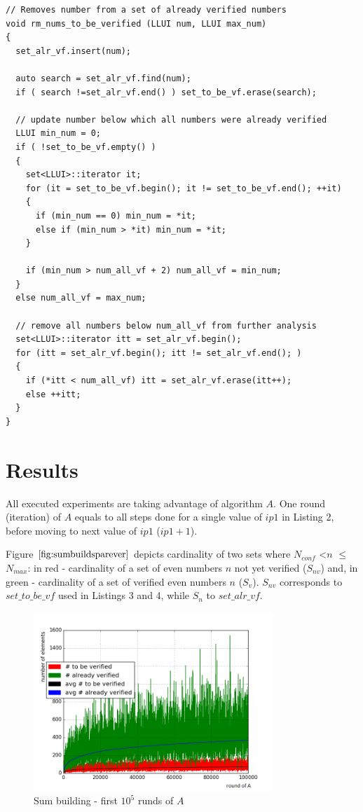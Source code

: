 \documentclass[10pt,twocolumn]{article}
\begin{document}
\lstset{language=C++}
\lstset{breaklines=true}
\lstset{frame=shadowbox}
\begin{lstlisting}[linewidth=8.7cm]
// Removes number from a set of already verified numbers 
void rm_nums_to_be_verified (LLUI num, LLUI max_num)
{
  set_alr_vf.insert(num);

  auto search = set_alr_vf.find(num);
  if ( search !=set_alr_vf.end() ) set_to_be_vf.erase(search);
	
  // update number below which all numbers were already verified
  LLUI min_num = 0;
  if ( !set_to_be_vf.empty() )
  {
    set<LLUI>::iterator it;
    for (it = set_to_be_vf.begin(); it != set_to_be_vf.end(); ++it)
    {
      if (min_num == 0) min_num = *it;
      else if (min_num > *it) min_num = *it;
    }

    if (min_num > num_all_vf + 2) num_all_vf = min_num;
  }
  else num_all_vf = max_num;
	
  // remove all numbers below num_all_vf from further analysis
  set<LLUI>::iterator itt = set_alr_vf.begin();
  for (itt = set_alr_vf.begin(); itt != set_alr_vf.end(); ) 
  {
    if (*itt < num_all_vf) itt = set_alr_vf.erase(itt++);
    else ++itt;
  }
}
\end{lstlisting}

\section{Results}

All executed experiments are taking advantage of algorithm $A$. One round (iteration) of $A$ equals to all steps done for a single value of $ip1$ in Listing 2, before moving to next value of $ip1$ ($ip1+1$). \par
Figure $\ref{fig:sumbuildsparever}$ depicts cardinality of two sets where $N_{conf}$ \textless $n$ $\leq$ $N_{max}$: in red - cardinality of a set of even numbers $n$ not yet verified ($S_{nv}$) and, in green - cardinality of a set of verified even numbers $n$ ($S_v$). $S_{nv}$ corresponds to $set\_to\_be\_vf$ used in Listings 3 and 4, while $S_n$ to $set\_alr\_vf$.

\begin{figure}[!ht]
\centering
\captionsetup{justification=centering}
\includegraphics[width=9cm]{f_sum_build_spare_and_to_be_verified}
\caption[caption]{Sum building - first $10^5$ runds of $A$}
\label{fig:sumbuildsparever}
\end{figure}
\end{document}
